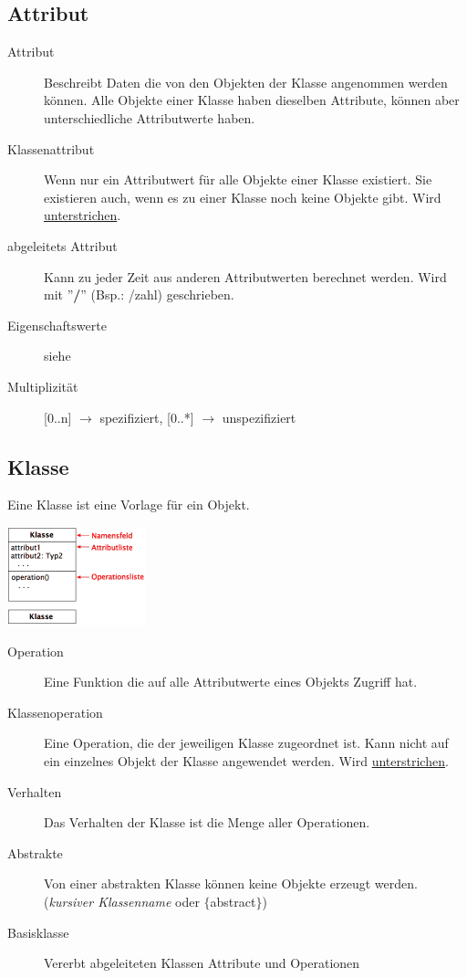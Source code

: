 \subsection{Attribut }
  \begin{description}
    \item[Attribut] 
      Beschreibt Daten die von den Objekten der Klasse angenommen
      werden können. Alle Objekte einer Klasse haben dieselben Attribute, können
      aber unterschiedliche Attributwerte haben.
    \item[Klassenattribut] 
      Wenn nur ein Attributwert für alle Objekte einer Klasse existiert. 
      Sie existieren auch, wenn es zu einer Klasse noch keine Objekte gibt.
      Wird \underline{unterstrichen}.
    \item[abgeleitets Attribut]
      Kann zu jeder Zeit aus anderen Attributwerten berechnet werden. Wird mit ''\textbf{/}'' (Bsp.: /zahl) geschrieben.  
    \item[Eigenschaftswerte]
      siehe       
    \item[Multiplizität]
      [0..n] $\rightarrow$ spezifiziert, [0..*] $\rightarrow$ unspezifiziert
  \end{description}
  
\subsection{Klasse }
  Eine Klasse ist eine Vorlage für ein Objekt.\\
 \begin{minipage}[t]{4cm}\includegraphics[width=4cm]{./images/klasse}\end{minipage}
 \begin{minipage}{15cm}
   \begin{description}
    \item[Operation] 
      Eine Funktion die auf alle Attributwerte eines Objekts Zugriff hat.
    \item[Klassenoperation] 
      Eine Operation, die der jeweiligen Klasse zugeordnet ist. 
      Kann nicht auf 
      ein einzelnes Objekt der Klasse angewendet werden. Wird \underline{unterstrichen}.
    \item[Verhalten] 
      Das Verhalten der Klasse ist die Menge aller Operationen.
    \item[Abstrakte] 
      Von einer abstrakten Klasse können keine Objekte erzeugt werden. 
      (\textit{kursiver Klassenname} oder $\lbrace$abstract$\rbrace$)
    \item[Basisklasse] 
      Vererbt abgeleiteten Klassen Attribute und Operationen
  \end{description}
  \end{minipage}
  
